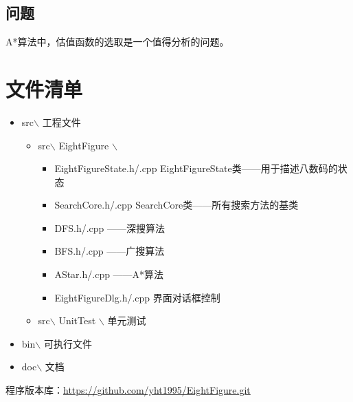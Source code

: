 \documentclass[12pt,a4paper]{article}
\begin{document}
\subsection{问题}
A*算法中，估值函数的选取是一个值得分析的问题。
\section{文件清单}
\begin{itemize}
\item src$\backslash$ 工程文件
\begin{itemize}
\item src$\backslash$ EightFigure $\backslash$
\begin{itemize}
\item EightFigureState.h/.cpp EightFigureState类——用于描述八数码的状态
\item SearchCore.h/.cpp SearchCore类——所有搜索方法的基类
\item DFS.h/.cpp ——深搜算法
\item BFS.h/.cpp ——广搜算法
\item AStar.h/.cpp ——A*算法
\item EightFigureDlg.h/.cpp  界面对话框控制
\end{itemize}
\item src$\backslash$ UnitTest $\backslash$ 单元测试
\end{itemize}

\item bin$\backslash$ 可执行文件
\item doc$\backslash$ 文档
\end{itemize}
程序版本库：\url{https://github.com/yht1995/EightFigure.git}
\end{document}
